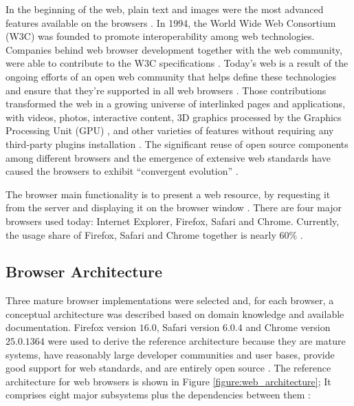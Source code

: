 In the beginning of the web, plain text and images were the most advanced features available on the browsers \cite{WC2006}. In 1994, the World Wide Web Consortium (W3C) was founded to promote interoperability among web technologies. Companies behind web browser development together with the web community, were able to contribute to the W3C specifications \cite{WC2006}. Today's web is a result of the ongoing efforts of an open web community that helps define these technologies and ensure that they're supported in all web browsers \cite{Grosskurth2005}. Those contributions transformed the web in a growing universe of interlinked pages and applications, with videos, photos, interactive content, 3D graphics processed by the Graphics Processing Unit (GPU) \cite{WebGL2013}, and other varieties of features without requiring any third-party plugins installation \cite{Hickson2013}. The significant reuse of open source components among different browsers and the emergence of extensive web standards have caused the browsers to exhibit ``convergent evolution'' \cite{Grosskurth2005}.

The browser main functionality is to present a web resource, by requesting it from the server and displaying it on the browser window \cite{Traffic2013}. There are four major browsers used today: Internet Explorer, Firefox, Safari and Chrome. Currently, the usage share of Firefox, Safari and Chrome together is nearly 60\% \cite{Traffic2013}.

\subsection{Browser Architecture} %
\label{sub:basic_concepts:web:browser_architecture}

Three mature browser implementations were selected and, for each browser, a conceptual architecture was described based on domain knowledge and available documentation. Firefox version $16.0$, Safari version $6.0.4$ and Chrome version $25.0.1364$ were used to derive the reference architecture because they are mature systems, have reasonably large developer communities and user bases, provide good support for web standards, and are entirely open source \cite{WC2006} \cite{Grosskurth2005}. The reference architecture for web browsers is shown in Figure \ref{figure:web_architecture}; It comprises eight major subsystems plus the dependencies between them \cite{Grosskurth2005}:

